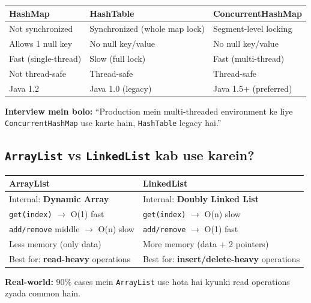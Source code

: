 \documentclass[12pt,a4paper]{article}
\begin{document}
\begin{answerbox}
\begin{center}
\begin{tabular}{p{3.5cm} p{3.5cm} p{4.5cm}}
\toprule
\textbf{HashMap} & \textbf{HashTable} & \textbf{ConcurrentHashMap} \\
\midrule
Not synchronized & Synchronized (whole map lock) & Segment-level locking \\
Allows 1 null key & No null key/value & No null key/value \\
Fast (single-thread) & Slow (full lock) & Fast (multi-thread) \\
Not thread-safe & Thread-safe & Thread-safe \\
Java 1.2 & Java 1.0 (legacy) & Java 1.5+ (preferred) \\
\bottomrule
\end{tabular}
\end{center}
\textbf{Interview mein bolo:} ``Production mein multi-threaded environment ke liye \texttt{ConcurrentHashMap} use karte hain, \texttt{HashTable} legacy hai.''
\end{answerbox}

\subsection{\texttt{ArrayList} vs \texttt{LinkedList} kab use karein?}

\begin{answerbox}
\begin{center}
\begin{tabular}{p{6cm} p{6cm}}
\toprule
\textbf{ArrayList} & \textbf{LinkedList} \\
\midrule
Internal: \textbf{Dynamic Array} & Internal: \textbf{Doubly Linked List} \\
\texttt{get(index)} $\rightarrow$ O(1) fast & \texttt{get(index)} $\rightarrow$ O(n) slow \\
\texttt{add/remove} middle $\rightarrow$ O(n) slow & \texttt{add/remove} $\rightarrow$ O(1) fast \\
Less memory (only data) & More memory (data + 2 pointers) \\
Best for: \textbf{read-heavy} operations & Best for: \textbf{insert/delete-heavy} operations \\
\bottomrule
\end{tabular}
\end{center}
\textbf{Real-world:} 90\% cases mein \texttt{ArrayList} use hota hai kyunki read operations zyada common hain.
\end{answerbox}
\end{document}
